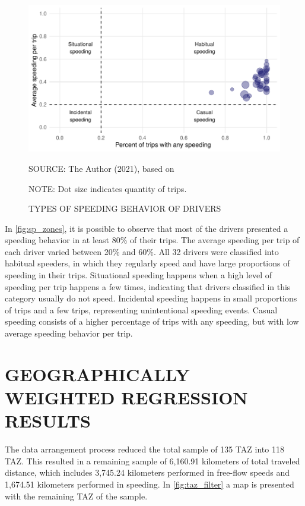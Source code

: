 \begin{figure}[!htbp]
    \centering\footnotesize
    \captionsetup{font=footnotesize}
    \caption{TYPES OF SPEEDING BEHAVIOR OF DRIVERS}
    \includegraphics{fig/sp_zones.pdf}
    \label{fig:sp_zones}
    \par SOURCE: The Author (2021), based on \textcite{Richard2013a}
    \par NOTE: Dot size indicates quantity of trips.
\end{figure}

In \autoref{fig:sp_zones}, it is possible to observe that most of the drivers presented a speeding behavior in at least 80\% of their trips. The average speeding per trip of each driver varied between 20\% and 60\%. All 32 drivers were classified into habitual speeders, in which they regularly speed and have large proportions of speeding in their trips. Situational speeding happens when a high level of speeding per trip happens a few times, indicating that drivers classified in this category usually do not speed. Incidental speeding happens in small proportions of trips and a few trips, representing unintentional speeding events. Casual speeding consists of a higher percentage of trips with any speeding, but with low average speeding behavior per trip.   

\section{GEOGRAPHICALLY WEIGHTED REGRESSION RESULTS} \label{sec:gwrr}



The data arrangement process reduced the total sample of 135 TAZ into 118 TAZ. This resulted in a remaining sample of 6,160.91 kilometers of total traveled distance, which includes 3,745.24 kilometers performed in free-flow speeds and 1,674.51 kilometers performed in speeding. In \autoref{fig:taz_filter} a map is presented with the remaining TAZ of the sample.  

